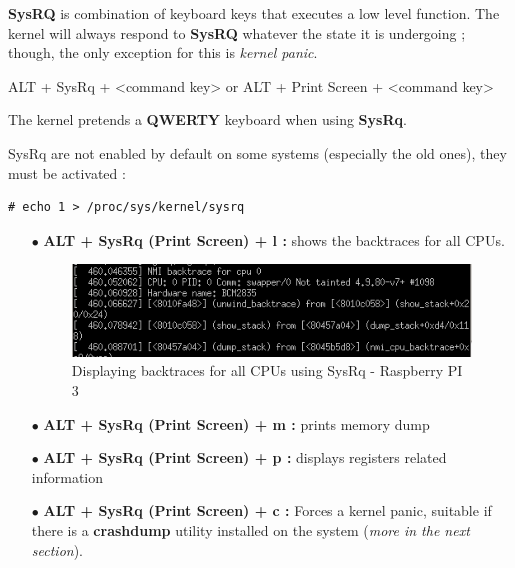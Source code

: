 \begin{itemize}
\textbf{SysRQ} is combination of keyboard keys that executes a low level function. The kernel will always respond to \textbf{SysRQ}
whatever the state it is undergoing ; though, the only exception for this is \emph{kernel panic}.
\begin{center}
ALT + SysRq + <command key>
or
ALT + Print Screen + <command key>
\end{center}


\begin{center}
\begin{mdframed}[
        linecolor=red,linewidth=2pt,%
        frametitlerule=true,%
        apptotikzsetting={\tikzset{mdfframetitlebackground/.append style={%
            shade,left color=white, right color=blue!20}}}, 
        frametitlerulecolor=blue,
        frametitlerulewidth=1pt, innertopmargin=\topskip,
        frametitle={SysRq involves QWERTY Keyboard},
        outerlinewidth=1.25pt
    ]
		The kernel pretends a \textbf{QWERTY} keyboard when using \textbf{SysRq}.
\end{mdframed}
\end{center}


\vspace{10px}

SysRq are not enabled by default on some systems (especially the old ones), they must be activated :

	\begin{lstlisting}[style=BashInputStyle]
# echo 1 > /proc/sys/kernel/sysrq
	\end{lstlisting}
	
	\begin{itemize}
		\item[$\bullet$] \textbf{ALT + SysRq (Print Screen) + l :} shows the backtraces for all CPUs.
		
    \begin{figure}[H]
			\centering
        	\includegraphics[scale=0.45]{img/solution/alt-sysrq-l.png}
        	\caption{Displaying backtraces for all CPUs using SysRq - Raspberry PI 3}
        	\label{Displaying backtraces for all CPUs using SysRq - Raspberry PI 3}
    \end{figure}		
		
		
		\item[$\bullet$] \textbf{ALT + SysRq (Print Screen) + m :} prints memory dump
		\item[$\bullet$] \textbf{ALT + SysRq (Print Screen) + p :} displays registers related information
		\item[$\bullet$] \textbf{ALT + SysRq (Print Screen) + c :} Forces a kernel panic, suitable if there is a \textbf{crashdump} utility installed on the system (\emph{more in the next section}).
	\end{itemize}
\end{itemize}



